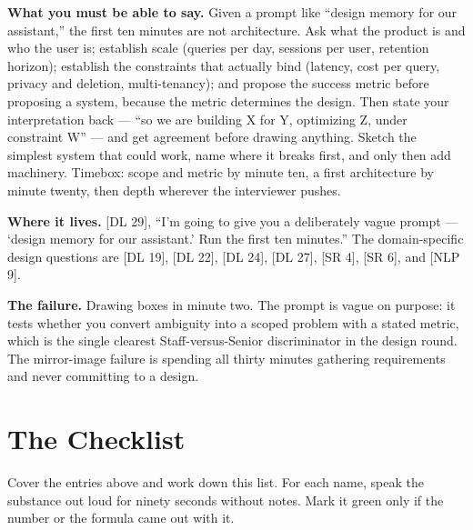 \textbf{What you must be able to say.} Given a prompt like ``design memory for our assistant,'' the first ten minutes are not architecture. Ask what the product is and who the user is; establish scale (queries per day, sessions per user, retention horizon); establish the constraints that actually bind (latency, cost per query, privacy and deletion, multi-tenancy); and propose the success metric before proposing a system, because the metric determines the design. Then state your interpretation back --- ``so we are building X for Y, optimizing Z, under constraint W'' --- and get agreement before drawing anything. Sketch the simplest system that could work, name where it breaks first, and only then add machinery. Timebox: scope and metric by minute ten, a first architecture by minute twenty, then depth wherever the interviewer pushes.

\textbf{Where it lives.} [DL 29], ``I'm going to give you a deliberately vague prompt --- `design memory for our assistant.' Run the first ten minutes.'' The domain-specific design questions are [DL 19], [DL 22], [DL 24], [DL 27], [SR 4], [SR 6], and [NLP 9].

\textbf{The failure.} Drawing boxes in minute two. The prompt is vague on purpose: it tests whether you convert ambiguity into a scoped problem with a stated metric, which is the single clearest Staff-versus-Senior discriminator in the design round. The mirror-image failure is spending all thirty minutes gathering requirements and never committing to a design.

\section*{The Checklist}

Cover the entries above and work down this list. For each name, speak the substance out loud for ninety seconds without notes. Mark it green only if the number or the formula came out with it.

